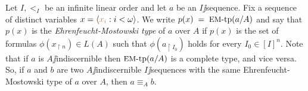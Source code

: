 \documentclass[creche.tex]{subfiles}
\begin{document}
Let $I,<_I$ be an infinite linear order and let $a$ be an $I\jj$sequence. Fix a sequence of distinct variables $x=\langle{\color{brown}x_i}: i<\omega\rangle$. We write \emph{$p(x)\;=\;\textrm{{\small EM}-tp}(a/A)$} and say that $p(x)$ is the \emph{Ehren\-feucht-Mostowski type\/} of $a$ over $A$ if $p(x)$ is the set of formulas $\phi(x_{\restriction n})\in L(A)$ such that $\phi(a_{\restriction I_0})$ holds for every $I_0\in[I]^{n}$. Note that if $a$ is $A\jj$indiscernible then $\textrm{{\small EM}\mbox{-}tp}(a/A)$ is a complete type, and vice versa. So, if $a$ and $b$ are two $A\jj$indiscernible $I\jj$sequences with the same Ehren\-feucht-Mostowski type of $a$ over $A$, then $a\equiv_A b$.
 
% 
% 
% 
% 
% 
% 
% 
% 
\end{document}
